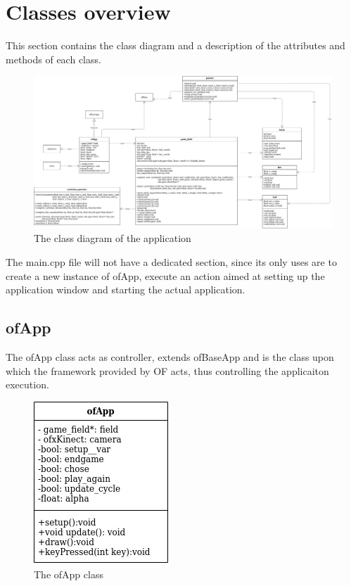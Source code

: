 \documentclass[]{article}
\begin{document}
\section{Classes overview}
This section contains the class diagram and a description of the attributes and methods of each class.
\begin{figure}[h!]
    \centering
    \includegraphics[angle=90, scale=0.23]{calss_diagram.jpg}
    \caption{The class diagram of the application}
    \label{fig:Class diagram}
\end{figure}
\newpage
The main.cpp file will not have a dedicated section, since its only uses are to create a new instance of ofApp, execute an action aimed at setting up the application window and starting the actual application.\\
\subsection{ofApp}
The ofApp class acts as controller, extends ofBaseApp and is the class upon which the framework provided by OF acts, thus controlling the applicaiton execution.
\begin{figure}[h!]
    \centering
    \includegraphics[scale=0.5]{ofApp.jpg}
    \caption{The ofApp class}
    \label{fig:ofApp class diagram }
\end{figure}
\end{document}
